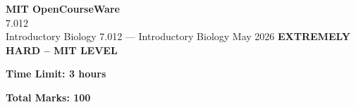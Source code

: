 \documentclass[12pt,a4paper]{exam}
\begin{document}
\begin{center}
{\LARGE \textbf{MIT OpenCourseWare}}\\7.012\\Introductory Biology
\vspace{0.5cm}
{7.012} --- {Introductory Biology}
\vspace{0.3cm}
May 2026
\vspace{0.3cm}
\textbf{EXTREMELY HARD -- MIT LEVEL}
\end{center}

\begin{center}
\textbf{Time Limit: 3 hours}
\end{center}

\begin{center}
\textbf{Total Marks: 100}
\end{center}

\vspace{0.5cm}
\end{document}
